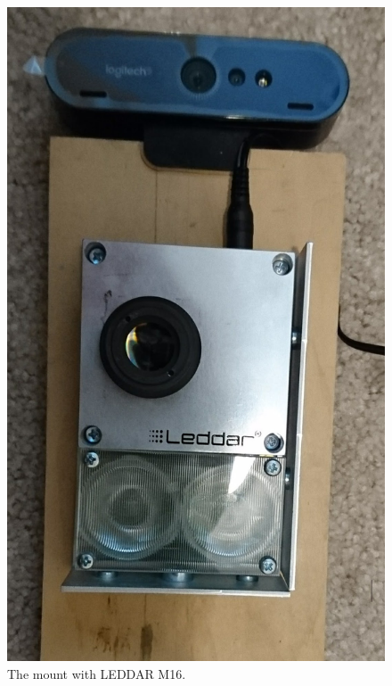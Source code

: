 \documentclass[onecolumn, draftclsnofoot,10pt, compsoc]{IEEEtran}
\makeatletter
\newcommand\captionof[1]{\def\@captype{#1}\caption}
\makeatother
\begin{document}
\begin{singlespace}
		\begin{figure}[H]
			\includegraphics[scale=0.15]{mount_m16.JPG}
			\captionof{figure}{The mount with LEDDAR M16.}
			\label{mount_m16}
		\end{figure}


\end{singlespace}
\end{document}
